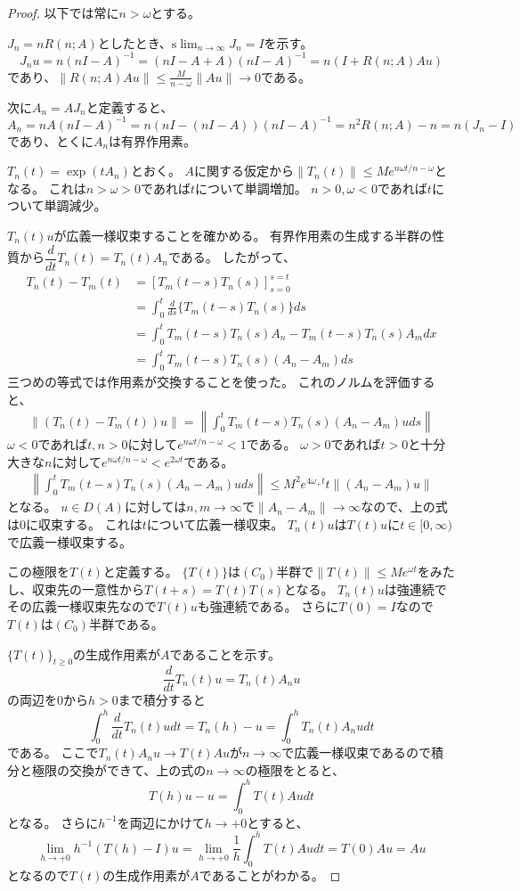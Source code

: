 \documentclass{jsarticle}
\newcommand{\norm}[1]{\|#1\|}
\newcommand{\slim}{\mathrm{s}\lim}
\begin{document}
\begin{proof}
以下では常に$n>\omega$とする。

$J_n=nR(n;A)$としたとき、$\slim_{n\to\infty}J_n=I$を示す。
\[
J_nu=n(nI-A)^{-1}=(nI-A+A)(nI-A)^{-1}=n(I+R(n;A)Au)
\]
であり、$\norm{R(n;A)Au}\leq\frac{M}{n-\omega}\norm{Au}\to0$である。

次に$A_n=AJ_n$と定義すると、
\[
A_n=nA(nI-A)^{-1}=n(nI-(nI-A))(nI-A)^{-1}=n^2R(n;A)-n=n(J_n-I)
\]
であり、とくに$A_n$は有界作用素。

$T_n(t)=\exp(tA_n)$とおく。
$A$に関する仮定から$\norm{T_n(t)}\leq Me^{n\omega t/n-\omega}$となる。
これは$n>\omega>0$であれば$t$について単調増加。
$n>0, \omega<0$であれば$t$について単調減少。

$T_n(t)u$が広義一様収束することを確かめる。
有界作用素の生成する半群の性質から$\dfrac{d}{dt}T_n(t)=T_n(t)A_n$である。
したがって、
\begin{align*}
T_n(t)-T_m(t)&=[T_m(t-s)T_n(s)]^{s=t}_{s=0}\\
&=\int^t_0\frac{d}{ds}\{T_m(t-s)T_n(s)\}ds\\
&=\int^t_0T_m(t-s)T_n(s)A_n-T_m(t-s)T_n(s)A_mdx\\
&=\int^t_0T_m(t-s)T_n(s)(A_n-A_m)ds
\end{align*}
三つめの等式では作用素が交換することを使った。
これのノルムを評価すると、
\begin{align*}
\norm{(T_n(t)-T_m(t))u}=\left\|\int^t_0T_m(t-s)T_n(s)(A_n-A_m)uds\right\|
\end{align*}
$\omega<0$であれば$t,n>0$に対して$e^{n\omega t/n-\omega}<1$である。
$\omega>0$であれば$t>0$と十分大きな$n$に対して$e^{n\omega t/n-\omega}<e^{2\omega t}$である。
\begin{align*}
\left\|\int^t_0T_m(t-s)T_n(s)(A_n-A_m)uds\right\|\leq M^2e^{4\omega_+t}t\norm{(A_n-A_m)u}
\end{align*}
となる。
$u\in D(A)$に対しては$n,m\to\infty$で$\norm{A_n-A_m}\to\infty$なので、上の式は$0$に収束する。
これは$t$について広義一様収束。
$T_n(t)u$は$T(t)u$に$t\in[0,\infty)$で広義一様収束する。

この極限を$T(t)$と定義する。
$\{T(t)\}$は$(C_0)$半群で$\norm{T(t)}\leq Me^{\omega t}$をみたし、収束先の一意性から$T(t+s)=T(t)T(s)$となる。
$T_n(t)u$は強連続でその広義一様収束先なので$T(t)u$も強連続である。
さらに$T(0)=I$なので$T(t)$は$(C_0)$半群である。

$\{T(t)\}_{t\geq0}$の生成作用素が$A$であることを示す。
\[
\frac{d}{dt}T_n(t)u=T_n(t)A_nu
\]
の両辺を$0$から$h>0$まで積分すると
\[
\int^h_0\frac{d}{dt}T_n(t)udt=T_n(h)-u=\int^h_0T_n(t)A_nudt
\]
である。
ここで$T_n(t)A_nu\to T(t)Au$が$n\to\infty$で広義一様収束であるので積分と極限の交換ができて、上の式の$n\to\infty$の極限をとると、
\[
T(h)u-u=\int^h_0T(t)Audt
\]
となる。
さらに$h^{-1}$を両辺にかけて$h\to+0$とすると、
\[
\lim_{h\to+0}h^{-1}(T(h)-I)u=\lim_{h\to+0}\frac{1}{h}\int^h_0T(t)Audt=T(0)Au=Au
\]
となるので$T(t)$の生成作用素が$A$であることがわかる。

\end{proof}
\end{document}
